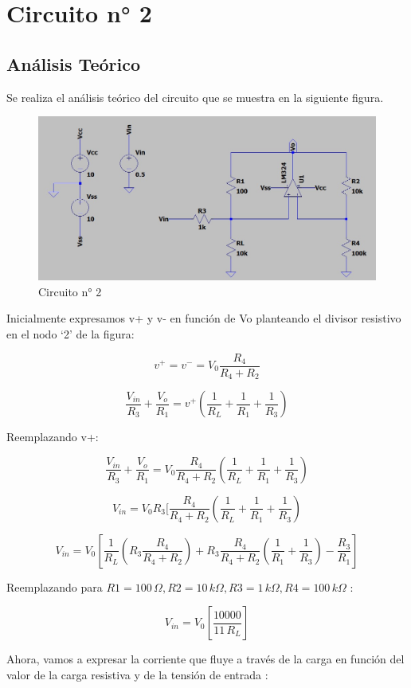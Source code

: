 \section{Circuito n° 2}

\subsection{Análisis Teórico}

Se realiza el análisis teórico del circuito que se muestra en la siguiente figura. 


\begin{figure}[H]
    \centering
    \includegraphics[width=0.7\linewidth]{Circuito2.jpg}
    \caption{Circuito n° 2}
\end{figure}

Inicialmente expresamos v+ y v- en función de Vo planteando el divisor resistivo en el nodo ‘2’ de la figura:

\[v^+ = v^- = V_0  \frac{R_4}{R_4 + R_2} \]

\[\frac{V_{in}}{R_3} + \frac{V_o}{R_1} = v^+ (\frac{1}{R_L}+\frac{1}{R_1}+\frac{1}{R_3}) \]

Reemplazando v+:

\[\frac{V_{in}}{R_3} + \frac{V_o}{R_1} = V_0  \frac{R_4}{R_4 + R_2} (\frac{1}{R_L}+\frac{1}{R_1}+\frac{1}{R_3})\]

\[{V_{in}} = V_0  R_3 [ \frac{R_4}{R_4 + R_2} (\frac{1}{R_L}+\frac{1}{R_1}+\frac{1}{R_3})\]

\[{V_{in}} = V_0 \left[ \frac{1}{R_L}(R_3 \frac{R_4}{R_4 + R_2}) + R_3\frac{R_4}{R_4 + R_2}(\frac{1}{R_1}+\frac{1}{R_3})-\frac{R_3}{R_1} \right] \]

Reemplazando para $ R1 = 100\,\Omega, R2 = 10\,k\Omega, R3 = 1\,k\Omega, R4 = 100\,k\Omega $ :

\[{V_{in}} = V_0 \left[ \frac{10000}{11\,R_L} \right]\]

Ahora, vamos a expresar la corriente que fluye a través de la carga en
función del valor de la carga resistiva y de la tensión de entrada :



